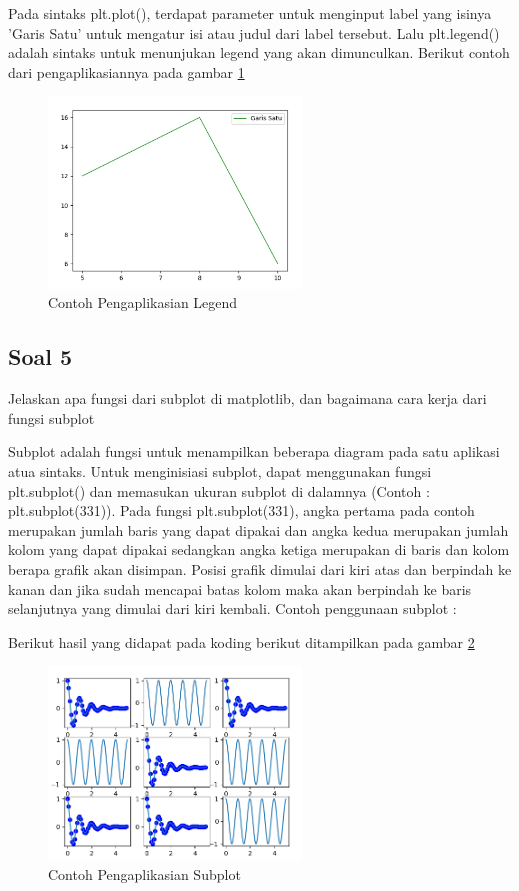 \begin{itemize}
Pada sintaks plt.plot(), terdapat parameter untuk menginput label yang isinya 'Garis Satu' untuk mengatur isi atau judul dari label tersebut. Lalu plt.legend() adalah sintaks untuk menunjukan legend yang akan dimunculkan. Berikut contoh dari pengaplikasiannya pada gambar \ref{Contoh_Soal4Legend} 
\begin{figure} [ht]
	\centerline{\includegraphics[width=0.6\textwidth]{figures/6/1174035/Teori/Soal4Legend.png}}
	\caption{Contoh Pengaplikasian Legend}
	\label{Contoh_Soal4Legend}
\end{figure}
\end{itemize}

\subsection{Soal 5}
Jelaskan apa fungsi dari subplot di matplotlib, dan bagaimana cara kerja dari fungsi subplot

Subplot adalah fungsi untuk menampilkan beberapa diagram pada satu aplikasi atua sintaks. Untuk menginisiasi subplot, dapat menggunakan fungsi plt.subplot() dan memasukan ukuran subplot di dalamnya (Contoh : plt.subplot(331)). Pada fungsi plt.subplot(331), angka pertama pada contoh merupakan jumlah baris yang dapat dipakai dan angka kedua merupakan jumlah kolom yang dapat dipakai sedangkan angka ketiga merupakan di baris dan kolom berapa grafik akan disimpan. Posisi grafik dimulai dari kiri atas dan berpindah ke kanan dan jika sudah mencapai batas kolom maka akan berpindah ke baris selanjutnya yang dimulai dari kiri kembali. Contoh penggunaan subplot : 

Berikut hasil yang didapat pada koding berikut ditampilkan pada gambar \ref{Contoh_Soal5}
\begin{figure} [ht]
	\centerline{\includegraphics[width=0.6\textwidth]{figures/6/1174035/Teori/Soal5.png}}
	\caption{Contoh Pengaplikasian Subplot}
	\label{Contoh_Soal5}
\end{figure}

